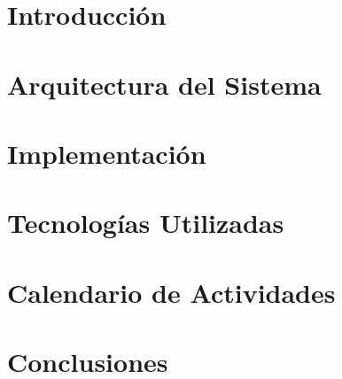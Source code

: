 \documentclass[12pt]{article}
\begin{document}



\newpage

\section*{Introducción}  


\section*{Arquitectura del Sistema}


\section*{Implementación}


\section*{Tecnologías Utilizadas}


\section*{Calendario de Actividades}


\section*{Conclusiones}

\end{document}

